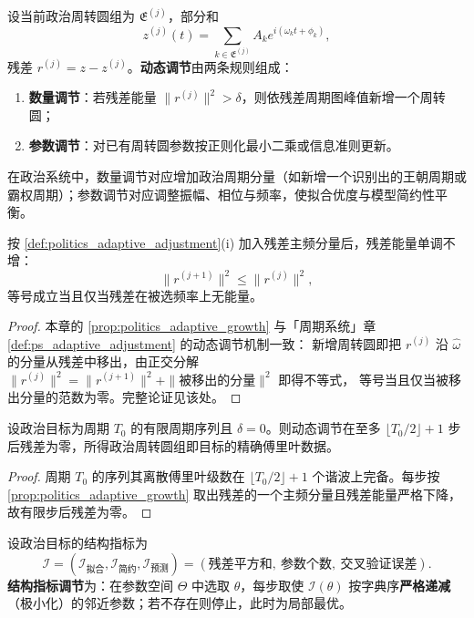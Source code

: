 \begin{definition}[政治周转圆组的动态调节]\label{def:politics_adaptive_adjustment}
设当前政治周转圆组为 $\mathfrak E^{(j)}$，部分和
\[
z^{(j)}(t)=\sum_{k\in\mathfrak E^{(j)}}A_k e^{i(\omega_k t+\phi_k)},
\]
残差 $r^{(j)}=z-z^{(j)}$。\textbf{动态调节}由两条规则组成：
\begin{enumerate}[label=(\roman*)]
    \item \textbf{数量调节}：若残差能量 $\|r^{(j)}\|^2>\delta$，则依残差周期图峰值新增一个周转圆；
    \item \textbf{参数调节}：对已有周转圆参数按正则化最小二乘或信息准则更新。
\end{enumerate}
在政治系统中，数量调节对应增加政治周期分量（如新增一个识别出的王朝周期或霸权周期）；参数调节对应调整振幅、相位与频率，使拟合优度与模型简约性平衡。
\end{definition}

\begin{proposition}[数量调节的单调性]\label{prop:politics_adaptive_growth}
按 \cref{def:politics_adaptive_adjustment}(i) 加入残差主频分量后，残差能量单调不增：
\[
\|r^{(j+1)}\|^2\le\|r^{(j)}\|^2,
\]
等号成立当且仅当残差在被选频率上无能量。
\end{proposition}

\begin{proof}
本章的 \cref{prop:politics_adaptive_growth} 与「周期系统」章 \cref{def:ps_adaptive_adjustment} 的动态调节机制一致：
新增周转圆即把 $r^{(j)}$ 沿 $\hat\omega$ 的分量从残差中移出，由正交分解
$\|r^{(j)}\|^2=\|r^{(j+1)}\|^2+\|\text{被移出的分量}\|^2$ 即得不等式，
等号当且仅当被移出分量的范数为零。完整论证见该处。
\end{proof}

\begin{theorem}[动态调节的收敛性]\label{thm:politics_adaptive_convergence}
设政治目标为周期 $T_0$ 的有限周期序列且 $\delta=0$。则动态调节在至多 $\lfloor T_0/2\rfloor+1$ 步后残差为零，所得政治周转圆组即目标的精确傅里叶数据。
\end{theorem}

\begin{proof}
周期 $T_0$ 的序列其离散傅里叶级数在 $\lfloor T_0/2\rfloor+1$ 个谐波上完备。每步按 \cref{prop:politics_adaptive_growth} 取出残差的一个主频分量且残差能量严格下降，故有限步后残差为零。
\end{proof}

\begin{definition}[结构指标调节]\label{def:politics_structure_metric_adjustment}
设政治目标的结构指标为
\[
\mathcal I=(\mathcal I_{\text{拟合}},\mathcal I_{\text{简约}},\mathcal I_{\text{预测}})
=(\text{残差平方和},\ \text{参数个数},\ \text{交叉验证误差}).
\]
\textbf{结构指标调节}为：在参数空间 $\Theta$ 中选取 $\theta$，每步取使 $\mathcal I(\theta)$ 按字典序\textbf{严格递减}（极小化）的邻近参数；若不存在则停止，此时为局部最优。
\end{definition}

